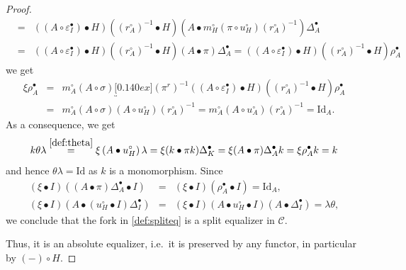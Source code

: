 \documentclass[nosumlimits,twoside]{amsart}
\theoremstyle{definition}
\theoremstyle{remark}
\newcommand{\Cc}{\mathcal{C}}
\begin{document}
\begin{proof}
\begin{eqnarray*}
&=&\left( \left( A\circ \varepsilon _{I}^{\bullet }\right) \bullet H\right)
\left( \left( r_{A}^{\circ }\right) ^{-1}\bullet H\right) \left( A\bullet
m_{H}^{\circ }\left( \pi \circ u_{H}^{\circ }\right) \left( r_{A}^{\circ
}\right) ^{-1}\right) \Delta _{A}^{\bullet } \\
&=&\left( \left( A\circ \varepsilon _{I}^{\bullet }\right) \bullet H\right)
\left( \left( r_{A}^{\circ }\right) ^{-1}\bullet H\right) \left( A\bullet
\pi \right) \Delta _{A}^{\bullet }=\left( \left( A\circ \varepsilon
_{I}^{\bullet }\right) \bullet H\right) \left( \left( r_{A}^{\circ }\right)
^{-1}\bullet H\right) \rho _{A}^{\bullet }
\end{eqnarray*}%
we get
\begin{eqnarray*}
\xi \rho _{A}^{\bullet } &=&m_{A}^{\circ }\left( A\circ \sigma \right)
\underbracket[0.140ex]{\left( \pi ^r\right) ^{-1}\left( \left( A\circ \varepsilon
_{I}^{\bullet }\right) \bullet H\right) \left( \left( r_{A}^{\circ }\right)
^{-1}\bullet H\right) \rho _{A}^{\bullet }} \\
&=&m_{A}^{\circ }\left( A\circ \sigma \right) \left( A\circ u_{H}^{\circ
}\right) \left( r_{A}^{\circ }\right) ^{-1}=m_{A}^{\circ }\left( A\circ
u_{A}^{\circ }\right) \left( r_{A}^{\circ }\right) ^{-1}=\mathrm{Id}_{A}.
\end{eqnarray*}%
As a consequence, we get%
\begin{equation*}
k\theta \lambda \overset{\eqref{def:theta}}{=}\xi \left( A\bullet u_{H}^{\circ }\right) \lambda =\xi (k\bullet \pi k)\Delta^\bullet_K=\xi(A\bullet\pi)\Delta^\bullet_A k=\xi \rho
_{A}^{\bullet }k=k
\end{equation*}%
and hence $\theta \lambda =\mathrm{Id}$ as $k$ is a monomorphism. Since%
\begin{eqnarray*}
\left( \xi \bullet I\right) \left( \left( A\bullet \pi \right) \Delta
_{A}^{\bullet }\bullet I\right)  &=&\left( \xi \bullet I\right) \left( \rho
_{A}^{\bullet }\bullet I\right) =\mathrm{Id}_{A}, \\
\left( \xi \bullet I\right) \left( A\bullet \left( u_{H}^{\circ }\bullet
I\right) \Delta _{I}^{\bullet }\right)  &=&\left( \xi \bullet I\right)
\left( A\bullet u_{H}^{\circ }\bullet I\right) \left( A\bullet \Delta
_{I}^{\bullet }\right) =\lambda \theta ,
\end{eqnarray*}%
we conclude that the fork in \eqref{def:spliteq} is a split equalizer in $\Cc$.

Thus, it is an absolute equalizer, i.e.\ it is preserved by any functor, in
particular by $\left( -\right) \circ H.$


\end{proof}
\end{document}
